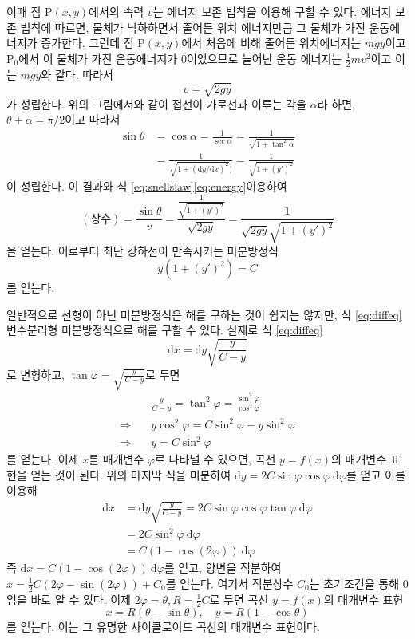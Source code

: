 이때 점 $\mathrm{P}(x, y)$에서의 속력 $v$는 에너지 보존 법칙을 이용해 구할 수 있다. 에너지 보존 법칙에 따르면, 물체가 낙하하면서 줄어든 위치 에너지만큼 그 물체가 가진 운동에너지가 증가한다. 그런데 %
점 $\mathrm{P}(x, y)$에서 처음에 비해 줄어든 위치에너지는 $mgy$이고 $\mathrm{P}_0$에서 이 물체가 가진 운동에너지가 $0$이었으므로 늘어난 운동 에너지는 $\frac{1}{2}mv^2$이고 이는  $mgy$와 같다. 따라서
\begin{equation}\label{eq:energy}
v=\sqrt{2gy}
\end{equation}
가 성립한다. 위의 그림에서와 같이 접선이 가로선과 이루는 각을 $\alpha$라 하면, $\theta+\alpha=\pi/2$이고 따라서
\begin{align*}
\sin\theta&=\cos\alpha=\frac{1}{\sec\alpha}=\frac{1}{\sqrt{1+\tan^2\alpha}} \\
& = \frac{1}{\sqrt{1+(\mathrm{d}y/\mathrm{d}x)^2})}=\frac{1}{\sqrt{1+(y')^2}}
\end{align*}
이 성립한다. 이 결과와 식 \eqref{eq:snellslaw}\와 \eqref{eq:energy}\를 이용하여
\[
(\mbox{상수})=\frac{\sin\theta}{v}=\frac{\frac{1}{\sqrt{1+(y')^2}}}{\sqrt{2gy}}=\frac{1}{\sqrt{2gy}\sqrt{1+(y')^2}}
\]
을 얻는다. 이로부터 최단 강하선이 만족시키는 미분방정식
\begin{equation}\label{eq:diffeq}
y(1+(y')^2)=C%
\end{equation}
를 얻는다.\par 


일반적으로 선형이 아닌 미분방정식은 해를 구하는 것이 쉽지는 않지만, 식 \eqref{eq:diffeq}\는 변수분리형 미분방정식으로 해를 구할 수 있다. 실제로 식 \eqref{eq:diffeq}\를
\[
\mathrm{d}x=\mathrm{d}y\sqrt{\frac{y}{C-y}}
\]
로 변형하고, $\tan\varphi=\sqrt{\frac{y}{C-y}}$로  두면
\begin{align*}
&\frac{y}{C-y}=\tan^2\varphi=\frac{\sin^2\varphi}{\cos^2\varphi}\\
\Rightarrow\quad & y\cos^2\varphi =C\sin^2\varphi -y\sin^2\varphi \\
\Rightarrow\quad & y=C\sin^2\varphi 
\end{align*}
를 얻는다. 이제 $x$를 매개변수 $\varphi$로 나타낼 수 있으면, 곡선 $y=f(x)$의 매개변수 표현을 얻는 것이 된다. 위의 마지막 식을 미분하여 $\mathrm{d}y=2C\sin\varphi\cos\varphi\ \mathrm{d}\varphi$를 얻고 이를 이용해
\begin{align*}
\mathrm{d}x&=\mathrm{d}y\sqrt{\frac{y}{C-y}}=2C\sin\varphi\cos\varphi\tan\varphi\ \mathrm{d}\varphi \\
&= 2C\sin^2\varphi\ \mathrm{d}\varphi \\
&= C(1-\cos(2\varphi))\ \mathrm{d}\varphi
\end{align*}
즉 $\mathrm{d}x=C(1-\cos(2\varphi))\ \mathrm{d}\varphi$를 얻고, 양변을 적분하여 $x=\frac{1}{2} C(2\varphi-\sin(2\varphi))+C_0$를 얻는다. 여기서 적분상수 $C_0$는 초기조건을 통해 $0$임을 바로 알 수 있다. 이제 $2\varphi=\theta, R=\frac{1}{2}C$로 두면 곡선 $y=f(x)$의 매개변수 표현
\[
x=R(\theta-\sin\theta),\quad y=%
R(1-\cos\theta)
\]
를 얻는다. 이는 그 유명한 사이클로이드 곡선의 매개변수 표현이다.

